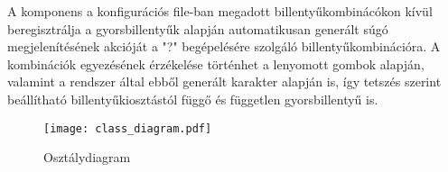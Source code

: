 A komponens a konfigurációs file-ban megadott billentyűkombinácókon kívül
beregisztrálja a gyorsbillentyűk alapján automatikusan generált súgó
megjelenítésének akcióját a "?" begépelésére szolgáló billentyűkombinációra.
A kombinációk egyezésének érzékelése történhet a lenyomott gombok alapján,
valamint a rendszer által ebből generált karakter alapján is, így tetszés
szerint beállítható billentyűkiosztástól függő és független gyorsbillentyű is.

\begin{figure}[H]
  \centering
    \texttt{[image: class\_diagram.pdf]}
  \caption{Osztálydiagram}
\end{figure}
